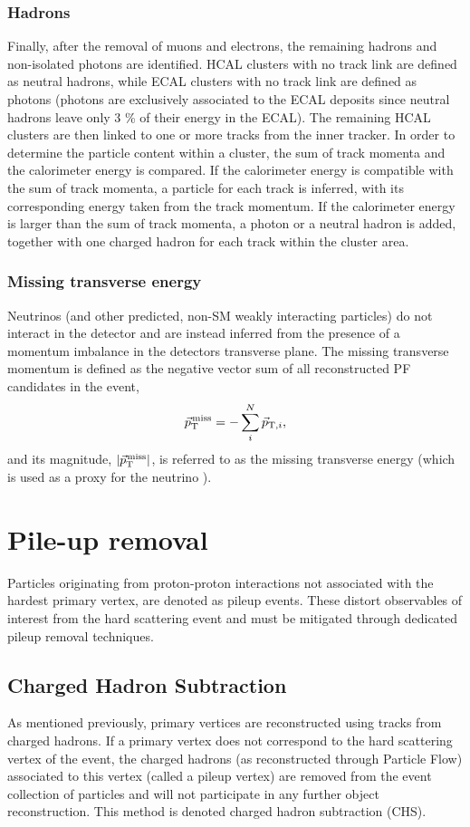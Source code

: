 \subsubsection{Hadrons}
Finally, after the removal of muons and electrons, the remaining hadrons and non-isolated photons are identified. HCAL clusters with no track link are defined as neutral hadrons, while ECAL clusters with no track link are defined as photons (photons are exclusively associated to the ECAL deposits since neutral hadrons leave only 3 \% of their energy in the ECAL).
The remaining HCAL clusters are then linked to one or more tracks from the inner tracker. In order to determine the particle content within a cluster, the sum of track momenta and the calorimeter energy is compared. If the calorimeter energy is compatible with the sum of track momenta, a particle for each track is inferred, with its corresponding energy taken from the track momentum. If the calorimeter energy is larger than the sum of track momenta, a photon or a neutral hadron is added, together with one charged hadron for each track within the cluster area.

\subsubsection{Missing transverse energy}
Neutrinos (and other predicted, non-SM weakly interacting particles) do not interact in the detector and are instead inferred from the presence of a momentum imbalance in the detectors transverse plane. The missing transverse momentum is defined as the negative \PT vector sum of all reconstructed PF candidates in the event,
\begin{equation}
{\vec p}_{\mathrm{T}}^{\kern1pt\text{miss}} = -\sum_{i}^{N}{\vec p}_{\mathrm{T},i},
\end{equation}
and its magnitude, $|{\vec p}_{\mathrm{T}}^{\kern1pt\text{miss}}|$, is referred to as the missing transverse energy \ETmiss (which is used as a proxy for the neutrino \PT).
 
\section{Pile-up removal}

Particles originating from proton-proton interactions not associated with the hardest primary vertex, are denoted as pileup events. These distort observables of interest from the hard scattering event and must be mitigated through dedicated pileup removal techniques.

\subsection{Charged Hadron Subtraction}
\label{subsub:objreco:chs}
As mentioned previously, primary vertices are reconstructed using tracks from charged hadrons. If a primary vertex does not correspond to the hard scattering vertex of the event, the charged hadrons (as reconstructed through Particle Flow) associated to this vertex (called a pileup vertex) are removed from the event collection of particles and will not participate in any further object reconstruction. This method is denoted charged hadron subtraction (CHS).

